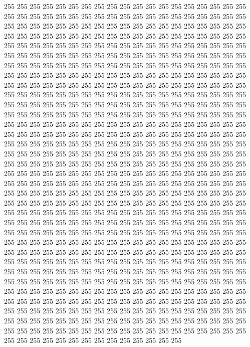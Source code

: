 255 255 255 255 255 255 255 255 255 255 255 255 255 255 255 255 255 255 255 255
255 255 255 255 255 255 255 255 255 255 255 255 255 255 255 255 255 255 255 255
255 255 255 255 255 255 255 255 255 255 255 255 255 255 255 255 255 255 255 255
255 255 255 255 255 255 255 255 255 255 255 255 255 255 255 255 255 255 255 255
255 255 255 255 255 255 255 255 255 255 255 255 255 255 255 255 255 255 255 255
255 255 255 255 255 255 255 255 255 255 255 255 255 255 255 255 255 255 255 255
255 255 255 255 255 255 255 255 255 255 255 255 255 255 255 255 255 255 255 255
255 255 255 255 255 255 255 255 255 255 255 255 255 255 255 255 255 255 255 255
255 255 255 255 255 255 255 255 255 255 255 255 255 255 255 255 255 255 255 255
255 255 255 255 255 255 255 255 255 255 255 255 255 255 255 255 255 255 255 255
255 255 255 255 255 255 255 255 255 255 255 255 255 255 255 255 255 255 255 255
255 255 255 255 255 255 255 255 255 255 255 255 255 255 255 255 255 255 255 255
255 255 255 255 255 255 255 255 255 255 255 255 255 255 255 255 255 255 255 255
255 255 255 255 255 255 255 255 255 255 255 255 255 255 255 255 255 255 255 255
255 255 255 255 255 255 255 255 255 255 255 255 255 255 255 255 255 255 255 255
255 255 255 255 255 255 255 255 255 255 255 255 255 255 255 255 255 255 255 255
255 255 255 255 255 255 255 255 255 255 255 255 255 255 255 255 255 255 255 255
255 255 255 255 255 255 255 255 255 255 255 255 255 255 255 255 255 255 255 255
255 255 255 255 255 255 255 255 255 255 255 255 255 255 255 255 255 255 255 255
255 255 255 255 255 255 255 255 255 255 255 255 255 255 255 255 255 255 255 255
255 255 255 255 255 255 255 255 255 255 255 255 255 255 255 255 255 255 255 255
255 255 255 255 255 255 255 255 255 255 255 255 255 255 255 255 255 255 255 255
255 255 255 255 255 255 255 255 255 255 255 255 255 255 255 255 255 255 255 255
255 255 255 255 255 255 255 255 255 255 255 255 255 255 255 255 255 255 255 255
255 255 255 255 255 255 255 255 255 255 255 255 255 255 255 255 255 255 255 255
255 255 255 255 255 255 255 255 255 255 255 255 255 255 255 255 255 255 255 255
255 255 255 255 255 255 255 255 255 255 255 255 255 255 255 255 255 255 255 255
255 255 255 255 255 255 255 255 255 255 255 255 255 255 255 255 255 255 255 255
255 255 255 255 255 255 255 255 255 255 255 255 255 255 255 255 255 255 255 255
255 255 255 255 255 255 255 255 255 255 255 255 255 255 255 255 255 255 255 255
255 255 255 255 255 255 255 255 255 255 255 255 255 255 255 255 255 255 255 255
255 255 255 255 255 255 255 255 255 255 255 255 255 255 255 255 255 255 255 255
255 255 255 255 255 255 255 255 255 255 255 255 255 255 255 255 255 255 255 255
